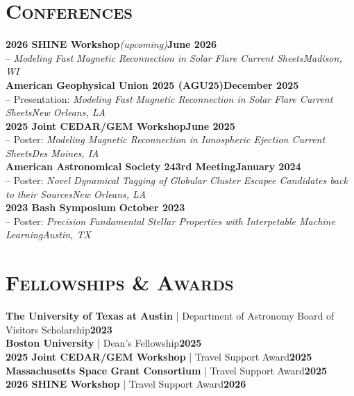 \documentclass[11pt]{article}
\begin{document}
\section{\textsc{Conferences}}
\textbf{2026 SHINE Workshop}\textit{(upcoming)}\hfill\small\textbf{June 2026}
\\ -- \textit{Modeling Fast Magnetic Reconnection in Solar Flare Current Sheets\hfill Madison, WI}
\\\textbf{American Geophysical Union 2025 (AGU25)}\hfill\small\textbf{December 2025}
\\ -- Presentation: \textit{Modeling Fast Magnetic Reconnection in Solar Flare Current Sheets\hfill New Orleans, LA}
\\\textbf{2025 Joint CEDAR/GEM Workshop}\hfill\small\textbf{June 2025}
\\ -- Poster: \textit{Modeling Magnetic Reconnection in Ionospheric Ejection Current Sheets\hfill Des Moines, IA}
\\\textbf{American Astronomical Society 243rd Meeting}\hfill\small\textbf{January 2024}
\\ -- Poster: \textit{Novel Dynamical Tagging of Globular Cluster Escapee Candidates back to their Sources\hfill New Orleans, LA}
\\\textbf{2023 Bash Symposium} \hfill\small\textbf{October 2023}
\\ -- Poster: \textit{Precision Fundamental Stellar Properties with Interpetable Machine Learning\hfill Austin, TX}

\section{\textsc{Fellowships \& Awards}}
\textbf{The University of Texas at Austin} | Department of Astronomy Board of Visitors Scholarship\hfill\textbf{2023}
\\\textbf{Boston University} | Dean's Fellowship\hfill\textbf{2025}
\\\textbf{2025 Joint CEDAR/GEM Workshop} | Travel Support Award\hfill\textbf{2025}
\\\textbf{Massachusetts Space Grant Consortium} | Travel Support Award\hfill\textbf{2025}
\\\textbf{2026 SHINE Workshop} | Travel Support Award\hfill\textbf{2026}
\end{document}
